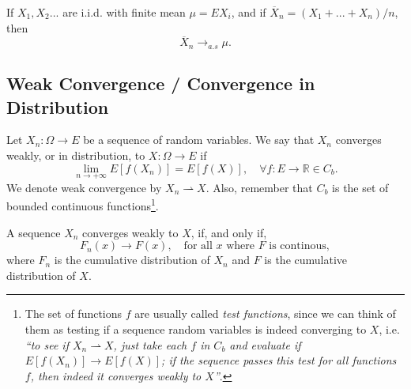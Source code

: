 \begin{theorem}
	If $X_1,X_2...$ are i.i.d. with finite mean $\mu = EX_i$, and if
	$\overline{X}_n = (X_1 + ... + X_n)/n$, then
	\begin{equation}
		\overline{X}_n \to_{a.s} \mu.
	\end{equation}
\end{theorem}

\subsection{Weak Convergence / Convergence in Distribution}

\begin{definition}
	Let $X_n:\Omega \to E$ be a sequence of random variables. We say that $X_n$ converges
	weakly, or in distribution, to $X:\Omega \to E$ if
	\begin{equation}
		\lim_{n\to+\infty}
		E[f(X_n)] = E[f(X)], \quad \forall f:E\to \mathbb R \in C_b.
	\end{equation}
	We denote weak convergence by $X_n \rightharpoonup X$. Also, remember that
	$C_b$ is the set of bounded continuous functions\footnote{The set of functions $f$
		are usually called \textit{test functions}, since we can think of them as
		testing if a sequence random variables is indeed converging to $X$, i.e.
		\textit{``to see if $X_n \rightharpoonup X$, just take each $f$ in $C_b$ and evaluate
			if $E[f(X_n)] \to E[f(X)]$; if the sequence passes this test for all functions $f$, then
			indeed it converges weakly to $X$''}.}.
\end{definition}

\begin{theorem}
	A sequence $X_n$ converges weakly to $X$, if, and only if,
	\begin{equation}
		F_n(x) \to F(x), \quad \text{for all $x$ where $F$ is continous},
	\end{equation}
	where $F_n$ is the cumulative distribution of $X_n$ and $F$
	is the cumulative distribution of $X$.
\end{theorem}

